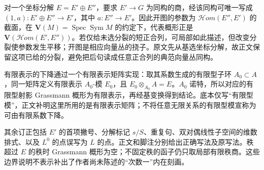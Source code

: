 对一个坐标分解 $E=E'\oplus E''$，要求 $E'\to G$ 为同构的商，经该同构可唯一写成 $(1,a):E'\oplus E''\to E'$，其中 $a:E''\to E'$。因此开图的参数为 $\mathscr H\!om(E'',E')$ 的截面，在 $\mathbf V(M)=\operatorname{Spec}\operatorname{Sym}M$ 的约定下，代表概形正是 $\mathbf V(\mathscr H\!om(E',E''))$。若仅给未选分裂的短正合列，可局部如此描述，但改变分裂使参数发生平移；开图是相应向量丛的挠子。原文先从基选坐标分解，故正文保留这项已给的分裂，避免把后句读成任意正合列的典范向量丛同构。

有限表示的下降通过一个有限表示矩阵实现：取其系数生成的有限型子环 $A_0\subset A$，同一矩阵定义有限表示 $A_0$-模 $E_0$，且 $E_0\otimes_{A_0}A=E$。$A_0$ 诺特，所以对应的有限型射影 Grassmann 概形为有限表示，再经基变换得到结论。底本仅写“有限型模”，正文补明这里所用的是有限表示矩阵；不将任意无限关系的有限型模宣称为可由有限系数下降。

其余订正包括 $E'$ 的首项撇号、分解标记 $s/S$、重复句、双对偶线性子空间的维数排式、以及 $L^0$ 的点误写为 $L$ 的点。正文和脚注分别给出正确写法及原写法。秩超过 $E$ 的秩时 Grassmann 概形为空；不固定秩的函子仍只取局部有限秩商。这些边界说明不表示补出了作者尚未陈述的“次数一”内在刻画。
